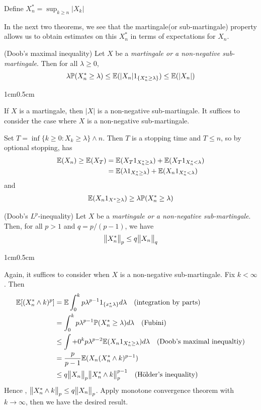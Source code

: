 \documentclass[12pt,a4paper]{report}
\newenvironment{proof}
{\begin{changemargin}{1cm}{0.5cm} 
	}%
	{\end{changemargin}
}
\begin{document}
\quad Define $X_n^* = \sup_{k\geq n} |X_k|$
\s

In the next two theorems, we see that the martingale(or sub-martingale) property allows us to obtain estimates on this $X_n^*$ in terms of expectations for $X_n$.\\
\s

 (Doob's maximal inequality) Let $X$ be a \emph{martingale or a non-negative sub-martingale}. Then for all $\lambda \geq 0$,
\begin{align*}
\lambda \mathbb{P}(X_n^* \geq \lambda) \leq \mathbb{E}(|X_n|   1_{\{ X_n^*\geq \lambda \}}) \leq \mathbb{E}(|X_n|)
\end{align*}
\begin{proof}
\pf If $X$ is a martingale, then $|X|$ is a non-negative sub-martingale. It suffices to consider the case where $X$ is a non-negative sub-martingale.

\quad Set $T = \inf \{ k \geq 0 : X_k \geq \lambda \} \wedge n$. Then $T$ is a stopping time and $T\leq n$, so by optional stopping, has
\begin{align*}
\mathbb{E}(X_n) \geq \mathbb{E}(X_T) &= \mathbb{E}(X_T 1_{X^*_n \geq \lambda}) + \mathbb{E}(X_T 1_{X^*_n < \lambda}) \\
& = \mathbb{E}( \lambda 1_{X^*_n \geq \lambda})  + \mathbb{E}(X_n 1_{X_n^* < \lambda})
\end{align*}
and
\begin{align*}
\mathbb{E}(X_n 1_{X^* \geq \lambda}) \geq \lambda \mathbb{P}(X^*_n \geq \lambda)
\end{align*}

\eop
\end{proof}
\s

 (Doob's $L^p$-inequality) Let $X$ be a \emph{martingale or a non-negative sub-martingale}. Then, for all $p>1$ and $q = p/(p-1)$, we have
\begin{align*}
\bigl\lVert X^*_n\bigr\rVert_{p} \leq q \bigl\lVert X_n\bigr\rVert_{q} 
\end{align*}
\begin{proof}
\pf Again, it suffices to consider when $X$ is a non-negative sub-martingale. Fix $k < \infty$. Then
\begin{align*}
\mathbb{E} [ (X^*_n \wedge k)^p  ] &= \mathbb{E} \int_0^k p \lambda^{p-1} 1_{\{x^*_n \lambda \}} d\lambda \quad \text{(integration by parts)}\\
& = \int_0^k p \lambda^{p-1} \mathbb{P}(X^*_n \geq \lambda) d\lambda \quad \text{(Fubini)} \\
& \leq \int+0^k p\lambda^{p-2} \mathbb{E} (X_n 1_{X^*_n \geq \lambda}) d\lambda \quad \text{(Doob's maximal inequaltiy)} \\
& =\frac{p}{p-1} \mathbb{E}(X_n (X^*_n \wedge k)^{p-1} ) \\
& \leq q \bigl\lVert X_n\bigr\rVert_{p} \bigl\lVert X^*_n \wedge k\bigr\rVert_{p}^{p-1} \quad \text{(H\"{o}lder's inequality)}
\end{align*}
Hence , $\bigl\lVert X^*_n \wedge k\bigr\rVert_{p} \leq q\bigl\lVert X_n\bigr\rVert_{p}$. Apply monotone convergence theorem with $k\rightarrow \infty$, then we have the desired result.

\eop
\end{proof}
\s
\end{document}
